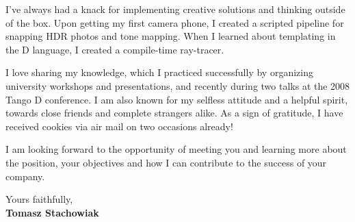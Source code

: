 \documentclass[11pt]{article}
\begin{document}
I've always had a knack for implementing creative solutions and thinking outside of the box. Upon getting my first camera phone, I created a scripted pipeline for snapping HDR photos and tone mapping. When I learned about templating in the D language, I created a compile-time ray-tracer.

I love sharing my knowledge, which I practiced successfully by organizing university workshops and presentations, and recently during two talks at the 2008 Tango D conference. I am also known for my selfless attitude and a helpful spirit, towards close friends and complete strangers alike. As a sign of gratitude, I have received cookies via air mail on two occasions already!

I am looking forward to the opportunity of meeting you and learning more about the position, your objectives and how I can contribute to the success of your company.
  
Yours faithfully,\\[2em] %
%
{\bfseries Tomasz Stachowiak}
%
\end{document}
